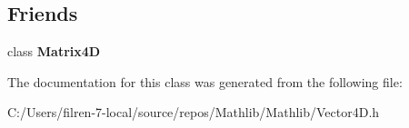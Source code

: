 \subsection*{Friends}
\begin{DoxyCompactItemize}
\item 
\mbox{\label{class_vector4_d_a499eadd5255c6932b6b82cc3513c9d0f}} 
class {\bfseries Matrix4D}
\end{DoxyCompactItemize}


The documentation for this class was generated from the following file\+:\begin{DoxyCompactItemize}
\item 
C\+:/\+Users/filren-\/7-\/local/source/repos/\+Mathlib/\+Mathlib/Vector4\+D.\+h\end{DoxyCompactItemize}

